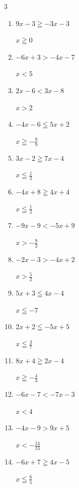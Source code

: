 \begin{multicols}{3}
\begin{enumerate}
        $\displaystyle x\leqq -\frac{7}{10}$

  \item $9x-3\geqq -3x-3$

        $\displaystyle x\geqq 0$

  \item $-6x+3>-4x-7$

        $\displaystyle x<5$

  \item $2x-6<3x-8$

        $\displaystyle x>2$

  \item $-4x-6\leqq 5x+2$

        $\displaystyle x\geqq -\frac{8}{9}$

  \item $3x-2\geqq 7x-4$

        $\displaystyle x\leqq \frac{1}{2}$

  \item $-4x+8\geqq 4x+4$

        $\displaystyle x\leqq \frac{1}{2}$

  \item $-9x-9<-5x+9$

        $\displaystyle x>-\frac{9}{2}$

  \item $-2x-3>-4x+2$

        $\displaystyle x>\frac{5}{2}$

  \item $5x+3\leqq 4x-4$

        $\displaystyle x\leqq -7$

  \item $2x+2\leqq -5x+5$

        $\displaystyle x\leqq \frac{3}{7}$

  \item $8x+4\geqq 2x-4$

        $\displaystyle x\geqq -\frac{4}{3}$

  \item $-6x-7<-7x-3$

        $\displaystyle x<4$

  \item $-4x-9>9x+5$

        $\displaystyle x<-\frac{14}{13}$

  \item $-6x+7\geqq 4x-5$

        $\displaystyle x\leqq \frac{6}{5}$


\end{enumerate}
\end{multicols}
